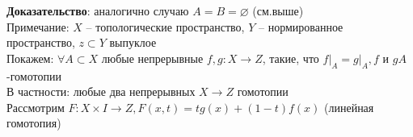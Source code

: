 	\textbf{Доказательство}: аналогично случаю $A = B = \varnothing$ (см.выше)\\
	Примечание: $X$ -- топологические пространство, $Y$ -- нормированное пространство, $z\subset Y$ выпуклое\\
	Покажем: $\forall A\subset X$ любые непрерывные $f,g: X\rightarrow Z$, такие, что ${f|}_A = {g|}_A, f$ и $g A$-гомотопии\\
	В частности: любые два непрерывных $X\rightarrow Z$ гомотопии\\
	Рассмотрим $F: X\times I \rightarrow Z, F(x,t) = tg(x) + (1-t) f(x)$ (линейная гомотопия)\\
	\begin{figure}[h]
	\end{figure}\\
	


\newpage
